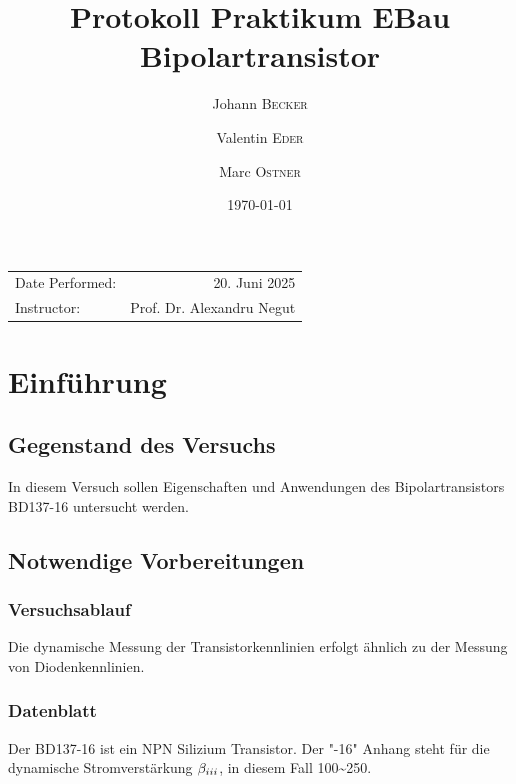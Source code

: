 \documentclass[
	a4paper, %
	12pt, %
]{CSUniSchoolLabReport}
\title{Protokoll Praktikum EBau Bipolartransistor} %
\author{Johann \textsc{Becker} \and Valentin \textsc{Eder} \and Marc \textsc{Ostner}}
\date{\today} %
\newcommand{\RNum}[1]{\uppercase\expandafter{\romannumeral #1\relax}}%
\begin{document}
\maketitle %


\begin{center}
	\begin{tabular}{l r}
		Date Performed: & 20. Juni 2025 \\ %
		
		Instructor: & Prof. Dr. Alexandru Negut %
	\end{tabular}
\end{center}



\section{Einführung}
\subsection{Gegenstand des Versuchs}
In diesem Versuch sollen Eigenschaften und Anwendungen des Bipolartransistors BD137-16 untersucht werden.
\subsection{Notwendige Vorbereitungen}
\subsubsection{Versuchsablauf}
Die dynamische Messung der Transistorkennlinien erfolgt ähnlich zu der Messung von Diodenkennlinien.
\subsubsection{Datenblatt}
Der BD137-16 ist ein NPN Silizium Transistor. 
Der "-16" Anhang steht für die dynamische Stromverstärkung $\beta_{\RNum{3}}$, in diesem Fall 100\textasciitilde 250. 
\end{document}
